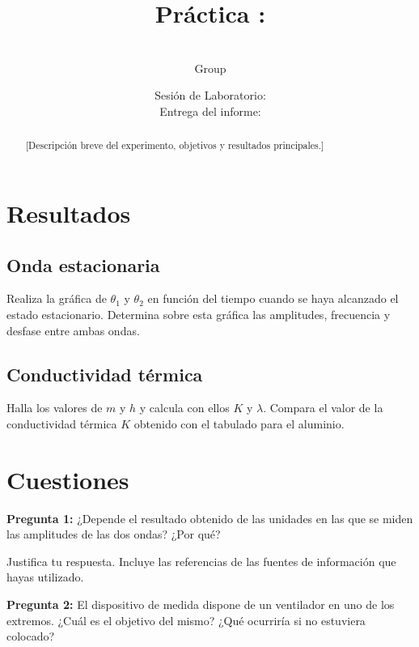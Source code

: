 \documentclass[a4paper,11pt]{article}
\title{Práctica \numeroPractica: \tituloPractica}
\author{\authorName \\ Group \groupNumber}
\date{Sesión de Laboratorio: \fechaPractica \\ Entrega del informe: \fechaEntrega}
\def\numeroPractica{12}                                    %
\def\tituloPractica{Ondas térmicas en una barra metálica}  %
\begin{document}
\maketitle

\begin{abstract}
[Descripción breve del experimento, objetivos y resultados principales.]
\end{abstract}

\tableofcontents
\newpage

\section{Resultados}

\subsection{Onda estacionaria}

Realiza la gráfica de $\theta_1$ y $\theta_2$ en función del tiempo cuando se haya alcanzado el estado estacionario. Determina sobre esta gráfica las amplitudes, frecuencia y desfase entre ambas ondas.

\subsection{Conductividad térmica}

Halla los valores de $m$ y $h$ y calcula con ellos $K$ y $\lambda$. Compara el valor de la conductividad térmica $K$ obtenido con el tabulado para el aluminio.

\section{Cuestiones}

\textbf{Pregunta 1:} ¿Depende el resultado obtenido de las unidades en las que se miden las amplitudes de las dos ondas? ¿Por qué?

Justifica tu respuesta. Incluye las referencias de las fuentes de información que hayas utilizado.

\textbf{Pregunta 2:} El dispositivo de medida dispone de un ventilador en uno de los extremos. ¿Cuál es el objetivo del mismo? ¿Qué ocurriría si no estuviera colocado?
\end{document}
